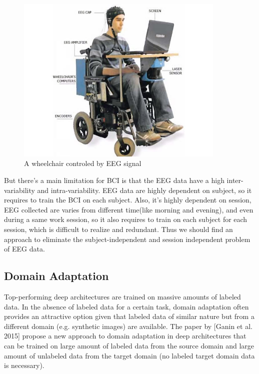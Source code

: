 \begin{figure}[htbp]
	\centering
	\includegraphics[width=10cm]{Figures/wheelchair.jpg}
	\caption[A wheelchair controled by EEG signal]{A wheelchair controled by EEG signal}
	\label{fig:wheelchair}
\end{figure}

But there's a main limitation for BCI is that the EEG data have a high inter-variability and intra-variability. EEG data are highly dependent on subject, so it requires to train the BCI on each subject. Also, it's highly dependent on session, EEG collected are varies from different time(like morning and evening), and even during a same work session, so it also requires to train on each subject for each session, which is difficult to realize and redundant. Thus we should find an approach to eliminate the subject-independent and session independent problem of EEG data.

\subsection{Domain Adaptation}
Top-performing deep architectures are trained on massive amounts of labeled data. In the absence of labeled data for a certain task, domain adaptation often provides an attractive option given that labeled data of similar nature but from a different domain (e.g. synthetic images) are available. The paper by [Ganin et al. 2015]\cite{ganin2014unsupervised} propose a new approach to domain adaptation in deep architectures that can be trained on large amount of labeled data from the source domain and large amount of unlabeled data from the target domain (no labeled target domain data is necessary).

